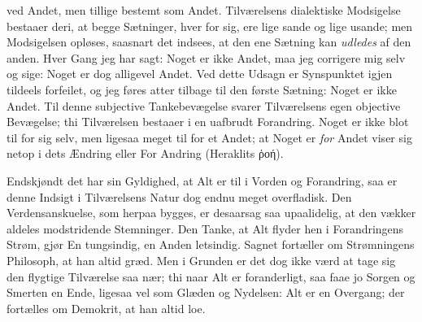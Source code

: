 \documentclass[12pt]{book}
\begin{document}
ved Andet, men tillige bestemt som Andet. Tilværelsens dialektiske Modsigelse bestaaer
deri, at begge Sætninger, hver for sig, ere lige sande og lige usande; men Modsigelsen
opløses, saasnart det indsees, at den ene Sætning kan \emph{udledes} af den anden.
Hver Gang jeg har sagt: Noget er ikke Andet, maa jeg corrigere mig selv og sige: Noget
er dog alligevel Andet. Ved dette Udsagn er Synspunktet igjen tildeels forfeilet, og
jeg føres atter tilbage til den første Sætning: Noget er ikke Andet. Til denne
subjective Tankebevægelse svarer Tilværelsens egen objective Bevægelse; thi
Tilværelsen bestaaer i en uafbrudt Forandring. Noget er ikke blot til for sig selv,
men ligesaa meget til for et Andet; at Noget er \emph{for} Andet viser sig netop i
dets Ændring eller For Andring (Heraklits ῥοή).

Endskjøndt det har sin Gyldighed, at Alt er til i Vorden og Forandring, saa er denne
Indsigt i Tilværelsens Natur dog endnu meget overfladisk. Den Verdensanskuelse, som
herpaa bygges, er desaarsag saa upaalidelig, at den vækker aldeles modstridende
Stemninger. Den Tanke, at Alt flyder hen i Forandringens Strøm, gjør En tungsindig, en
Anden letsindig. Sagnet fortæller om Strømningens Philosoph, at han altid græd. Men i
Grunden er det dog ikke værd at tage sig den flygtige Tilværelse saa nær; thi naar Alt
er foranderligt, saa faae jo Sorgen og Smerten en Ende, ligesaa vel som Glæden og
Nydelsen: Alt er en Overgang; der fortælles om Demokrit, at han altid loe.
\end{document}
